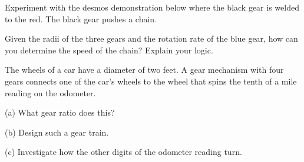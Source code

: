 \documentclass{ximera}
\begin{document}
\begin{question}  \label{Q1764:Angles}
Experiment with the desmos demonstration below where the black gear is welded to the red. The black gear pushes a chain.  

Given the radii of the three gears and the rotation rate of the blue gear, how can you determine the speed of the chain? Explain your logic.

 
\begin{onlineOnly}
    \begin{center}
\end{center}
\end{onlineOnly}
\end{question}







\begin{question}  \label{Q323342:Angles}
The wheels of a car have a diameter of two feet. A gear mechanism with four gears connects one of the car's wheels to the wheel that spins the tenth of a mile reading on the odometer. %

(a) What gear ratio does this?

(b) Design such a gear train.

(c) Investigate how the other digits of the odometer reading turn.
\end{question}
\end{document}
